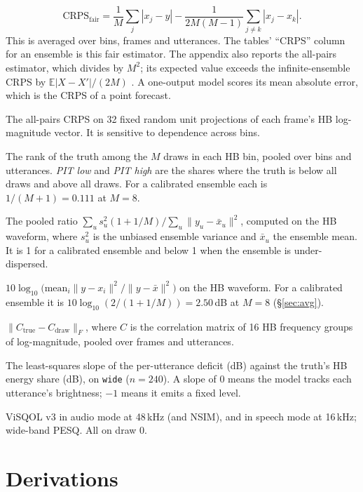 \documentclass[10pt,letterpaper]{article}
\newcommand{\E}{\mathbb{E}}
\begin{document}
\begin{description}[leftmargin=1.2em,style=nextline]
\[
\mathrm{CRPS}_{\mathrm{fair}}=\frac1M\sum_j|x_j-y|-\frac{1}{2M(M-1)}\sum_{j\neq k}|x_j-x_k| .
\]
This is averaged over bins, frames and utterances. The tables' ``CRPS'' column for an ensemble is this fair
estimator. The appendix also reports the all-pairs estimator, which divides by $M^2$; its expected value
exceeds the infinite-ensemble CRPS by $\E|X-X'|/(2M)$ \cite{ferro2008}. A one-output model scores its mean
absolute error, which is the CRPS of a point forecast.
\item[Sliced CRPS] The all-pairs CRPS on 32 fixed random unit projections of each frame's HB log-magnitude
vector. It is sensitive to dependence across bins.
\item[PIT tails] The rank of the truth among the $M$ draws in each HB bin, pooled over bins and utterances.
\emph{PIT low} and \emph{PIT high} are the shares where the truth is below all draws and above all draws. For a
calibrated ensemble each is $1/(M+1)=0.111$ at $M=8$.
\item[Spread] The pooled ratio $\sum_u s_u^2(1+1/M)\big/\sum_u\|y_u-\bar x_u\|^2$, computed on the HB waveform,
where $s_u^2$ is the unbiased ensemble variance and $\bar x_u$ the ensemble mean. It is 1 for a calibrated
ensemble and below 1 when the ensemble is under-dispersed.
\item[Gap] $10\log_{10}\big(\mathrm{mean}_i\|y-x_i\|^2/\|y-\bar x\|^2\big)$ on the HB waveform. For a
calibrated ensemble it is $10\log_{10}(2/(1+1/M))=2.50$\,dB at $M=8$ (\S\ref{sec:avg}).
\item[corr err] $\|C_{\mathrm{true}}-C_{\mathrm{draw}}\|_F$, where $C$ is the correlation matrix of 16 HB
frequency groups of log-magnitude, pooled over frames and utterances.
\item[Slope] The least-squares slope of the per-utterance deficit (dB) against the truth's HB energy share (dB),
on \texttt{wide} ($n=240$). A slope of 0 means the model tracks each utterance's brightness; $-1$ means it
emits a fixed level.
\item[Perceptual] ViSQOL v3 in audio mode at 48\,kHz (and NSIM), and in speech mode at 16\,kHz; wide-band PESQ.
All on draw 0.
\end{description}

\section{Derivations}\label{sec:deriv}
\end{document}

